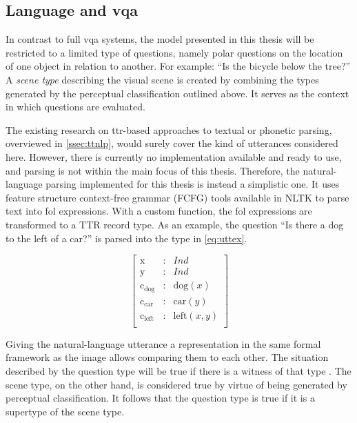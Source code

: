 \subsection{Language and \acrshort{vqa}}
\label{ssec:languagevqa}

In contrast to full \gls{vqa} systems, the model presented in this thesis will be restricted to a limited type of questions, namely polar questions on the location of one object in relation to another.
For example: ``Is the bicycle below the tree?''
A \textit{scene type} describing the visual scene is created by combining the types generated by the perceptual classification outlined above.
It serves as the context in which questions are evaluated.

The existing research on \gls{ttr}-based approaches to textual or phonetic parsing, overviewed in \autoref{ssec:ttnlp}, would surely cover the kind of utterances considered here.
However, there is currently no implementation available and ready to use, and parsing is not within the main focus of this thesis.
Therefore, the natural-language parsing implemented for this thesis is instead a simplistic one.
It uses feature structure context-free grammar (FCFG) tools available in NLTK \citep{BirdNaturalLanguageProcessing2009} to parse text into \gls{fol} expressions.
With a custom function, the \gls{fol} expressions are transformed to a TTR record type.
As an example, the question ``Is there a dog to the left of a car?'' is parsed into the type in \autoref{eq:uttex}.

\begin{equation}\label{eq:uttex}
\left[\begin{array}{rcl}
\text{x} &:& Ind\\
\text{y} &:& Ind\\
\text{c}_\text{dog} &:& \text{dog}(x)\\
\text{c}_\text{car} &:& \text{car}(y)\\
\text{c}_\text{left} &:& \text{left}(x, y)\\
\end{array}\right]\end{equation}

Giving the natural-language utterance a representation in the same formal framework as the image allows comparing them to each other.
The situation described by the question type will be true if there is a witness of that type \citep{BarwiseSituationsAttitudes1981,CooperAustiniantruthattitudes2005}.
The scene type, on the other hand, is considered true by virtue of being generated by perceptual classification.
It follows that the question type is true if it is a supertype of the scene type.

